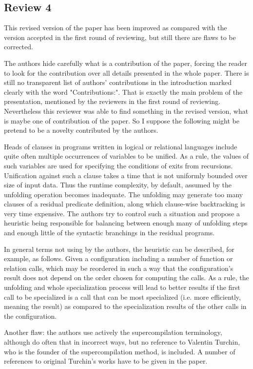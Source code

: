 
\subsection*{Review 4}
This revised version of the paper has been improved as compared with the version accepted in the first round of reviewing, but still there are flaws to be corrected.

The authors hide carefully what is a contribution of the paper, forcing the reader to look for the contribution over all details presented in the whole paper. There is still no transparent list of authors' contributions in the introduction marked clearly with the word "Contributions:". That is exactly the main problem of the presentation, mentioned by the reviewers in the first round of reviewing.
Nevertheless this reviewer was able to find something in the revised version, what is maybe one of contribution of the paper. So I suppose the following might be pretend to be a novelty contributed by the authors.

Heads of clauses in programs written in logical or relational languages include quite often multiple occurrences of variables to be unified. As a rule, the values of such variables are used for specifying the conditions of exits from recursions. Unification against such a clause takes a time that is not uniformly bounded over size of input data. Thus the runtime complexity, by default, assumed by the unfolding operation becomes inadequate. The unfolding may generate too many clauses of a residual predicate definition, along which clause-wise backtracking is very time expensive. The authors try to control such a situation and propose a heuristic being responsible for balancing between enough many of unfolding steps and enough little of the syntactic branchings in the residual programs.

In general terms not using by the authors, the heuristic can be described, for example, as follows.
Given a configuration including a number of function or relation calls, which may be reordered in such a way that the configuration's result does not depend on the order chosen for computing the calls. As a rule, the unfolding and whole specialization process will lead to better results if the first call to be specialized is a call that can be most specialized (i.e. more efficiently, meaning the result) as compared to the specialization results of the other calls in the configuration.

Another flaw: the authors use actively the supercompilation terminology, although do often that in incorrect ways, but no reference to Valentin Turchin, who is the founder of the supercompilation method, is included.  A number of references to original Turchin's works have to be given in the paper.

